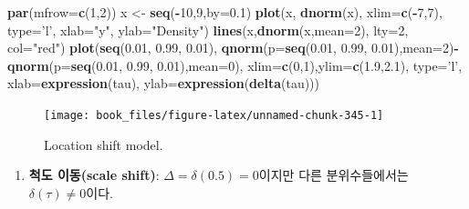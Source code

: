 \documentclass[b5paper,]{scrbook}
\makeatletter
\newenvironment{Shaded}{\begin{snugshade}}{\end{snugshade}}
\newcommand{\DataTypeTok}[1]{\textcolor[rgb]{0.13,0.29,0.53}{#1}}
\newcommand{\DecValTok}[1]{\textcolor[rgb]{0.00,0.00,0.81}{#1}}
\newcommand{\FloatTok}[1]{\textcolor[rgb]{0.00,0.00,0.81}{#1}}
\newcommand{\KeywordTok}[1]{\textcolor[rgb]{0.13,0.29,0.53}{\textbf{#1}}}
\newcommand{\NormalTok}[1]{#1}
\newcommand{\OperatorTok}[1]{\textcolor[rgb]{0.81,0.36,0.00}{\textbf{#1}}}
\newcommand{\StringTok}[1]{\textcolor[rgb]{0.31,0.60,0.02}{#1}}
\providecommand{\tightlist}{%
  \setlength{\itemsep}{0pt}\setlength{\parskip}{0pt}}
\theoremstyle{plain}
\theoremstyle{definition}
\numberwithin{equation}{section}
\newenvironment{kframe}{%
\medskip{}
\setlength{\fboxsep}{.8em}
 \def\at@end@of@kframe{}%
 \ifinner\ifhmode%
  \def\at@end@of@kframe{\end{minipage}}%
  \begin{minipage}{\columnwidth}%
 \fi\fi%
 \def\FrameCommand##1{\hskip\@totalleftmargin \hskip-\fboxsep
 \colorbox{shadecolor}{##1}\hskip-\fboxsep
     \hskip-\linewidth \hskip-\@totalleftmargin \hskip\columnwidth}%
 \MakeFramed {\advance\hsize-\width
   \@totalleftmargin\z@ \linewidth\hsize
   \@setminipage}}%
 {\par\unskip\endMakeFramed%
 \at@end@of@kframe}
\renewenvironment{Shaded}{\begin{kframe}}{\end{kframe}}
\makeatother
\begin{document}
\begin{Shaded}
\begin{Highlighting}[]
\KeywordTok{par}\NormalTok{(}\DataTypeTok{mfrow=}\KeywordTok{c}\NormalTok{(}\DecValTok{1}\NormalTok{,}\DecValTok{2}\NormalTok{))}
\NormalTok{x <-}\StringTok{ }\KeywordTok{seq}\NormalTok{(}\OperatorTok{-}\DecValTok{10}\NormalTok{,}\DecValTok{9}\NormalTok{,}\DataTypeTok{by=}\FloatTok{0.1}\NormalTok{)}
\KeywordTok{plot}\NormalTok{(x, }\KeywordTok{dnorm}\NormalTok{(x), }\DataTypeTok{xlim=}\KeywordTok{c}\NormalTok{(}\OperatorTok{-}\DecValTok{7}\NormalTok{,}\DecValTok{7}\NormalTok{), }\DataTypeTok{type=}\StringTok{'l'}\NormalTok{, }\DataTypeTok{xlab=}\StringTok{"y"}\NormalTok{, }\DataTypeTok{ylab=}\StringTok{"Density"}\NormalTok{)}
\KeywordTok{lines}\NormalTok{(x,}\KeywordTok{dnorm}\NormalTok{(x,}\DataTypeTok{mean=}\DecValTok{2}\NormalTok{), }\DataTypeTok{lty=}\DecValTok{2}\NormalTok{, }\DataTypeTok{col=}\StringTok{"red"}\NormalTok{)}
\KeywordTok{plot}\NormalTok{(}\KeywordTok{seq}\NormalTok{(}\FloatTok{0.01}\NormalTok{, }\FloatTok{0.99}\NormalTok{, }\FloatTok{0.01}\NormalTok{), }\KeywordTok{qnorm}\NormalTok{(}\DataTypeTok{p=}\KeywordTok{seq}\NormalTok{(}\FloatTok{0.01}\NormalTok{, }\FloatTok{0.99}\NormalTok{, }\FloatTok{0.01}\NormalTok{),}\DataTypeTok{mean=}\DecValTok{2}\NormalTok{)}\OperatorTok{-}\StringTok{ }\KeywordTok{qnorm}\NormalTok{(}\DataTypeTok{p=}\KeywordTok{seq}\NormalTok{(}\FloatTok{0.01}\NormalTok{, }\FloatTok{0.99}\NormalTok{, }\FloatTok{0.01}\NormalTok{),}\DataTypeTok{mean=}\DecValTok{0}\NormalTok{), }\DataTypeTok{xlim=}\KeywordTok{c}\NormalTok{(}\DecValTok{0}\NormalTok{,}\DecValTok{1}\NormalTok{),}\DataTypeTok{ylim=}\KeywordTok{c}\NormalTok{(}\FloatTok{1.9}\NormalTok{,}\FloatTok{2.1}\NormalTok{), }\DataTypeTok{type=}\StringTok{'l'}\NormalTok{, }\DataTypeTok{xlab=}\KeywordTok{expression}\NormalTok{(tau), }\DataTypeTok{ylab=}\KeywordTok{expression}\NormalTok{(}\KeywordTok{delta}\NormalTok{(tau)))}
\end{Highlighting}
\end{Shaded}

\begin{figure}

{\centering \texttt{[image: book\_files/figure-latex/unnamed-chunk-345-1]} 

}

\caption{Location shift model.}\label{fig:unnamed-chunk-345}
\end{figure}

\begin{enumerate}
\def\labelenumi{\arabic{enumi}.}
\setcounter{enumi}{1}
\tightlist
\item
  \textbf{척도 이동(scale shift)}: \(\Delta = \delta(0.5)=0\)이지만 다른 분위수들에서는 \(\delta(\tau)\neq 0\)이다.
\end{enumerate}
\end{document}
